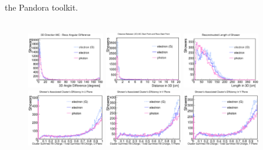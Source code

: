 the Pandora toolkit.\\
\\
\begin{figure}[htbp]
\begin{center}
\includegraphics[width=0.3\textwidth]{figs/mc/single_em/AngleDiff.eps}
\includegraphics[width=0.3\textwidth]{figs/mc/single_em/StartingPointAcc.eps}
\includegraphics[width=0.3\textwidth]{figs/mc/single_em/Length.eps}
\includegraphics[width=0.3\textwidth]{figs/mc/single_em/ClusterEffU.eps}
\includegraphics[width=0.3\textwidth]{figs/mc/single_em/ClusterEffV.eps}
\includegraphics[width=0.3\textwidth]{figs/mc/single_em/ClusterEffY.eps}

\end{center}
\end{figure}

